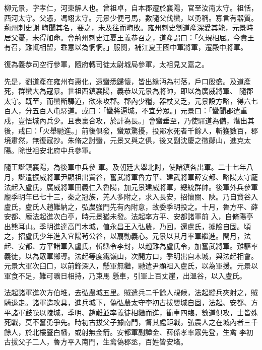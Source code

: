 
\begin{pinyinscope}

 柳元景，字孝仁，河東解人也。曾祖卓，自本郡遷於襄陽，官至汝南太守。祖恬，西河太守。父憑，馮翊太守。元景少便弓馬，數隨父伐蠻，以勇稱。寡言有器質。荊州刺史謝
 晦聞其名，要之，未及往而晦敗。雍州刺史劉道產深愛其能，元景時居父憂，未得加命。會荊州刺史江夏王義恭召之，道產謂曰：「久規相屈。今貴王有召，難輒相留，乖意以為惘惘。」服闋，補江夏王國中軍將軍，遷殿中將軍。



 復為義恭司空行參軍，隨府轉司徒太尉城局參軍，太祖見又嘉之。



 先是，劉道產在雍州有惠化，遠蠻悉歸懷，皆出緣沔為村落，戶口殷盛。及道產死，群蠻大為寇暴。世祖西鎮襄陽，義恭以元景為將帥，即以為廣威將軍、
 隨郡太守。既至，而蠻斷驛道，欲來攻郡。郡內少糧，器杖又乏，元景設方略，得六七百人，分五百人屯驛道。或曰：「蠻將逼城，不宜分眾。」元景曰：「蠻聞郡遣重戍，豈悟城內兵少。且表裏合攻，於計為長。」會蠻垂至，乃使驛道為備，潛出其後，戒曰：「火舉馳進。」前後俱發，蠻眾驚擾，投鄖水死者千餘人，斬獲數百，郡境肅然，無復寇抄。朱脩之討蠻，元景又與之俱，後又副沈慶之徵鄖山，進克太陽。除世祖安北府中兵參軍。



 隨王誕鎮襄陽，為後軍中兵參
 軍。及朝廷大舉北討，使諸鎮各出軍。二十七年八月，誕遣振威將軍尹顯祖出貲谷，奮武將軍魯方平、建武將軍薛安都、略陽太守龐法起入盧氏，廣威將軍田義仁入魯陽，加元景建威將軍，總統群帥。後軍外兵參軍龐季明年已七十三，秦之冠族，羌人多附之，求入長安，招懷關、陜。乃自貲谷入盧氏，盧氏人趙難納之，弘農強門先有內附意，故委季明投之。十月，魯方平、薛安都、龐法起進次白亭，時元景猶未發。法起率方平、安都諸軍前
 入，自脩陽亭出熊耳山。季明進達高門木城，值永昌王入弘農，乃回，還盧氏，據險自固。頃之，招盧氏少年進入宜陽茍公谷，以扇動義心。元景以其月率軍繼進。閏月，法起、安都、方平諸軍入盧氏，斬縣令李封，以趙難為盧氏令，加奮武將軍。難驅率義徒，以為眾軍鄉導。法起等度鐵嶺山，次開方口，季明出自木城，與法起相會。元景大軍次臼口，以前鋒深入，懸軍無繼，馳遣尹顯祖入盧氏，以為軍援。元景以軍食不足，難可曠日相持，乃束馬
 懸車，引軍上百丈崖，出溫谷，以入盧氏。



 法起諸軍進次方伯堆，去弘農城五里。賊遣兵二千餘人覘候，法起縱兵夾射之，賊騎退走。諸軍造攻具，進兵城下，偽弘農太守李初古拔嬰城自固，法起、安都、方平諸軍鼓噪以陵城，季明、趙難並率義徒相繼而進，衝車四臨，數道俱攻，士皆殊死戰，莫不奮勇爭先。時初古拔父子據南門，督其處距戰，弘農人之在城內者三千餘人，於北樓豎白幡，或射無金箭。安都軍副譚金、薛係孝率眾先登，生禽
 李初古拔父子二人，魯方平入南門，生禽偽郡丞，百姓皆安堵。




\end{pinyinscope}
